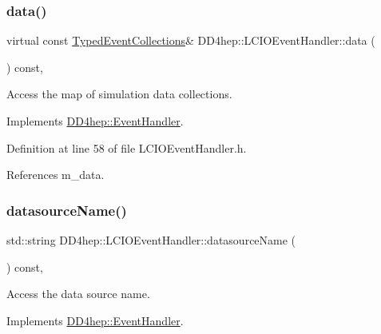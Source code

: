 \subsubsection{\texorpdfstring{data()}{data()}}
{\footnotesize\ttfamily virtual const \hyperlink{class_d_d4hep_1_1_event_handler_a4d441ff8a824b1e2f278e8b7a6391af3}{Typed\+Event\+Collections}\& D\+D4hep\+::\+L\+C\+I\+O\+Event\+Handler\+::data (\begin{DoxyParamCaption}{ }\end{DoxyParamCaption}) const\hspace{0.3cm}{\ttfamily [inline]}, {\ttfamily [virtual]}}



Access the map of simulation data collections. 



Implements \hyperlink{class_d_d4hep_1_1_event_handler_a263d136331d72994bcbf537d4aa16d4f}{D\+D4hep\+::\+Event\+Handler}.



Definition at line 58 of file L\+C\+I\+O\+Event\+Handler.\+h.



References m\+\_\+data.

\hypertarget{class_d_d4hep_1_1_l_c_i_o_event_handler_ace6d753b27597445ebfe9e77f1c1afcf}{}\label{class_d_d4hep_1_1_l_c_i_o_event_handler_ace6d753b27597445ebfe9e77f1c1afcf} 
\subsubsection{\texorpdfstring{datasource\+Name()}{datasourceName()}}
{\footnotesize\ttfamily std\+::string D\+D4hep\+::\+L\+C\+I\+O\+Event\+Handler\+::datasource\+Name (\begin{DoxyParamCaption}{ }\end{DoxyParamCaption}) const\hspace{0.3cm}{\ttfamily [inline]}, {\ttfamily [virtual]}}



Access the data source name. 



Implements \hyperlink{class_d_d4hep_1_1_event_handler_a5fa231363a787ba7edf520b5a99f294e}{D\+D4hep\+::\+Event\+Handler}.



